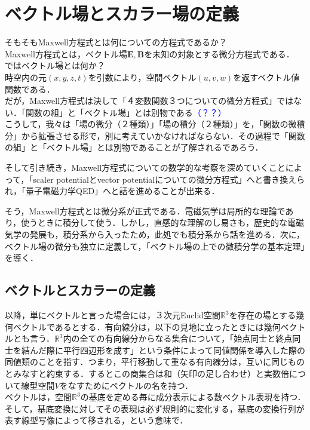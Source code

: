 \documentclass[uplatex, 12pt, a4paper]{jsarticle}
\begin{document}
\section{ベクトル場とスカラー場の定義}

そもそもMaxwell方程式とは何についての方程式であるか？\\
Maxwell方程式とは，ベクトル場$\mathbf{E,B}$を未知の対象とする微分方程式である．\\
ではベクトル場とは何か？\\
時空内の元$(x,y,z,t)$を引数により，空間ベクトル$(u,v,w)$を返すベクトル値関数である．\\
だが，Maxwell方程式は決して「４変数関数３つについての微分方程式」ではない．「関数の組」と「ベクトル場」とは別物である\textcolor{blue}{（？？）}\\
こうして，我々は「場の微分（２種類）」「場の積分（２種類）」を，「関数の微積分」から拡張させる形で，別に考えていかなければならない．その過程で「関数の組」と「ベクトル場」とは別物であることが了解されるであろう．

そして引き続き，Maxwell方程式についての数学的な考察を深めていくことによって，「scaler potentialとvector potentialについての微分方程式」へと書き換えられ，「量子電磁力学QED」へと話を進めることが出来る．

そう，Maxwell方程式とは微分系が正式である．電磁気学は局所的な理論であり，使うときに積分して使う．しかし，直感的な理解のし易さも，歴史的な電磁気学の発展も，積分系から入ったため，此処でも積分系から話を進める．次に，ベクトル場の微分も独立に定義して，「ベクトル場の上での微積分学の基本定理」を導く．

\subsection{ベクトルとスカラーの定義}

以降，単にベクトルと言った場合には，３次元Euclid空間$\mathbb{R}^3$を存在の場とする幾何ベクトルであるとする．有向線分は，以下の見地に立ったときには幾何ベクトルとも言う．$\mathbb{R}^3$内の全ての有向線分からなる集合について，「始点同士と終点同士を結んだ際に平行四辺形を成す」という条件によって同値関係を導入した際の同値類のことを指す．つまり，平行移動して重なる有向線分は，互いに同じものとみなすと約束する．するとこの商集合は和（矢印の足し合わせ）と実数倍について線型空間$V$をなすためにベクトルの名を持つ．\\
ベクトルは，空間$\mathbb{R}^3$の基底を定める毎に成分表示による数ベクトル表現を持つ．そして，基底変換に対してその表現は必ず規則的に変化する，基底の変換行列が表す線型写像によって移される，という意味で．
\end{document}
